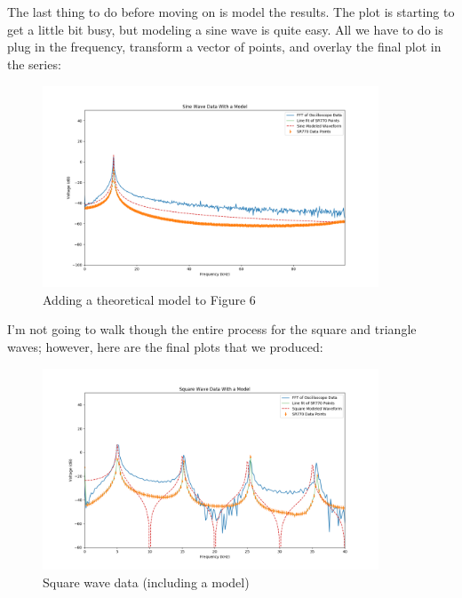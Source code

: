 \documentclass{article}
\begin{document}
The last thing to do before moving on is model the results. The plot is
starting to get a little bit busy, but modeling a sine wave is quite easy. All
we have to do is plug in the frequency, transform a vector of points, and
overlay the final plot in the series:

\begin{figure}[H]
    \centering
\begin{minipage}{11cm}
\begin{tcolorbox}
        \includegraphics[width=10cm, height=6cm]{figures/figure7.png}
        \caption{Adding a theoretical model to Figure 6}
        \label{fig:fig7}
\end{tcolorbox}
\end{minipage}
\end{figure}

I'm not going to walk though the entire process for the square and triangle
waves; however, here are the final plots that we produced:

\begin{figure}[H]
    \centering
\begin{minipage}{11cm}
\begin{tcolorbox}
        \includegraphics[width=10cm, height=6cm]{figures/figure8.png}
        \caption{Square wave data (including a model)}
        \label{fig:fig8}
\end{tcolorbox}
\end{minipage}
\end{figure}
\end{document}
